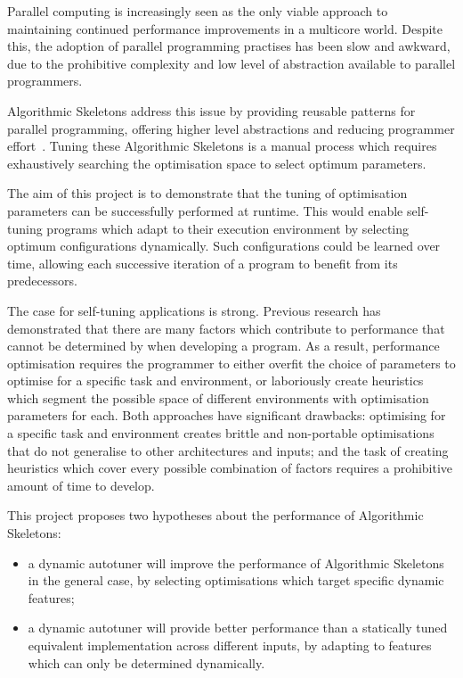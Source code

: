 Parallel computing is increasingly seen as the only viable approach to
maintaining continued performance improvements in a multicore
world. Despite this, the adoption of parallel programming practises
has been slow and awkward, due to the prohibitive complexity and low
level of abstraction available to parallel programmers.

Algorithmic Skeletons address this issue by providing reusable
patterns for parallel programming, offering higher level abstractions
and reducing programmer effort~\cite{Cole1989, Cole2004}. Tuning these
Algorithmic Skeletons is a manual process which requires exhaustively
searching the optimisation space to select optimum parameters.

The aim of this project is to demonstrate that the tuning of
optimisation parameters can be successfully performed at runtime. This
would enable self-tuning programs which adapt to their execution
environment by selecting optimum configurations dynamically. Such
configurations could be learned over time, allowing each successive
iteration of a program to benefit from its predecessors.

The case for self-tuning applications is strong. Previous research has
demonstrated that there are many factors which contribute to
performance that cannot be determined by when developing a program. As
a result, performance optimisation requires the programmer to either
overfit the choice of parameters to optimise for a specific task and
environment, or laboriously create heuristics which segment the
possible space of different environments with optimisation parameters
for each. Both approaches have significant drawbacks: optimising for a
specific task and environment creates brittle and non-portable
optimisations that do not generalise to other architectures and
inputs; and the task of creating heuristics which cover every possible
combination of factors requires a prohibitive amount of time to
develop.

This project proposes two hypotheses about the performance of
Algorithmic Skeletons:
\begin{itemize}
\item a dynamic autotuner will improve the performance of Algorithmic
  Skeletons in the general case, by selecting optimisations which
  target specific dynamic features;
\item a dynamic autotuner will provide better performance than a
  statically tuned equivalent implementation across different inputs,
  by adapting to features which can only be determined dynamically.
\end{itemize}

